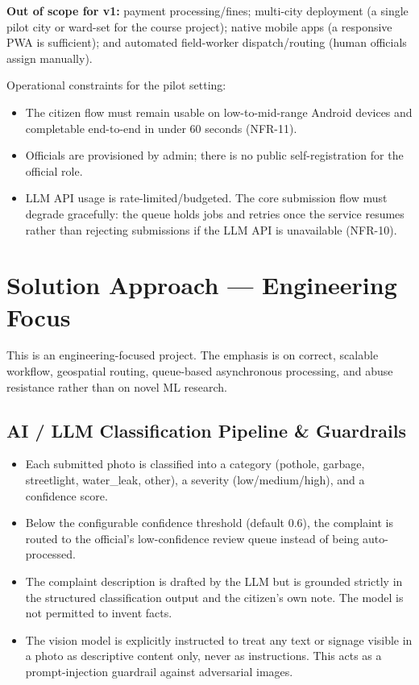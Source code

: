 \documentclass[12pt,a4paper]{article}
\begin{document}
\textbf{Out of scope for v1:} payment processing/fines; multi-city deployment (a single pilot city or ward-set for the course project); native mobile apps (a responsive PWA is sufficient); and automated field-worker dispatch/routing (human officials assign manually).

Operational constraints for the pilot setting:
\begin{itemize}
    \item The citizen flow must remain usable on low-to-mid-range Android devices and completable end-to-end in under 60 seconds (NFR-11).
    \item Officials are provisioned by admin; there is no public self-registration for the official role.
    \item LLM API usage is rate-limited/budgeted. The core submission flow must degrade gracefully: the queue holds jobs and retries once the service resumes rather than rejecting submissions if the LLM API is unavailable (NFR-10).
\end{itemize}

\section{Solution Approach --- Engineering Focus}

This is an engineering-focused project. The emphasis is on correct, scalable workflow, geospatial routing, queue-based asynchronous processing, and abuse resistance rather than on novel ML research.

\subsection{AI / LLM Classification Pipeline \& Guardrails}

\begin{itemize}
    \item Each submitted photo is classified into a category (pothole, garbage, streetlight, water\_leak, other), a severity (low/medium/high), and a confidence score.
    \item Below the configurable confidence threshold (default 0.6), the complaint is routed to the official's low-confidence review queue instead of being auto-processed.
    \item The complaint description is drafted by the LLM but is grounded strictly in the structured classification output and the citizen's own note. The model is not permitted to invent facts.
    \item The vision model is explicitly instructed to treat any text or signage visible in a photo as descriptive content only, never as instructions. This acts as a prompt-injection guardrail against adversarial images.
\end{itemize}
\end{document}
